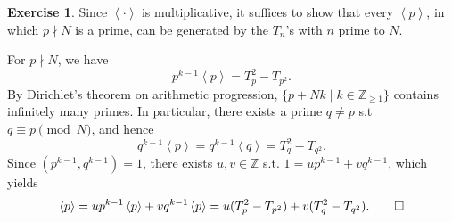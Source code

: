 \documentclass{article}
\theoremstyle{definition}
\newtheorem{example}{Exercise}
\theoremstyle{remark}
\newcommand{\C}{\mathbb{C}}
\newcommand{\Z}{\mathbb{Z}}
\newcommand{\gene}[1]{\left\langle #1 \right\rangle} %
\newcommand{\under}{\backslash}
\begin{document}
\begin{example}
Since $\gene{\cdot}$ is multiplicative,
it suffices to show that every $\gene{p}$, in which $p\nmid N$ is a prime, can be generated by the $T_n$'s with $n$ prime to $N$.

For $p\nmid N$, we have\[p^{k-1}\gene{p} = T_p^2 - T_{p^2}.\]
By Dirichlet's theorem on arithmetic progression,
$\{p + Nk\mid k\in\Z_{\ge 1}\}$ contains infinitely many primes.
In particular, there exists a prime $q\ne p$
s.t  $q\equiv p\pmod N$, and hence\[q^{k-1}\gene{p} = q^{k-1}\gene{q} = T_q^2 - T_{q^2}.\]
Since $(p^{k-1}, q^{k-1}) = 1$, there exists $u, v\in\Z$ s.t. $1 = up^{k-1} + vq^{k-1}$,
which yields
\[\gene{p} = up^{k-1}\gene{p} + vq^{k-1}\gene{p} = u(T_p^2 - T_{p^2}) + v(T_q^2 - T_{q^2}).\qedhere\]


\end{example}

\end{document}
